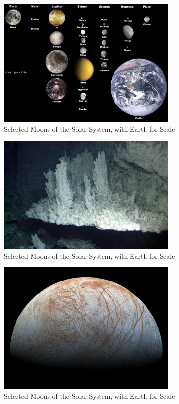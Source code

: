 \documentclass[]{article}
\begin{document}
\begin{figure}[H]
	\caption{Selected Moons of the Solar System, with Earth for Scale}\label{fig:icy:1}
	\includegraphics[width=0.8\textwidth]{icy1}
\end{figure}

\begin{figure}[H]
	\caption{Selected Moons of the Solar System, with Earth for Scale}\label{fig:icy:2}
	\includegraphics[width=0.8\textwidth]{icy2}
\end{figure}

\begin{figure}[H]
	\caption{Selected Moons of the Solar System, with Earth for Scale}\label{fig:icy:3}
	\includegraphics[width=0.8\textwidth]{icy3}
\end{figure}
\end{document}
